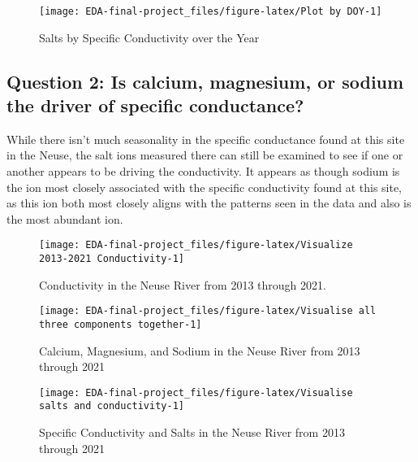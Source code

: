 \documentclass[
  12pt,
]{article}
\begin{document}
\begin{figure}

\texttt{[image: EDA-final-project\_files/figure-latex/Plot by DOY-1]} \hfill{}

\caption{Salts by Specific Conductivity over the Year}\label{fig:Plot by DOY}
\end{figure}

\hypertarget{question-2-is-calcium-magnesium-or-sodium-the-driver-of-specific-conductance}{%
\subsection{Question 2: Is calcium, magnesium, or sodium the driver of
specific
conductance?}\label{question-2-is-calcium-magnesium-or-sodium-the-driver-of-specific-conductance}}

While there isn't much seasonality in the specific conductance found at
this site in the Neuse, the salt ions measured there can still be
examined to see if one or another appears to be driving the
conductivity. It appears as though sodium is the ion most closely
associated with the specific conductivity found at this site, as this
ion both most closely aligns with the patterns seen in the data and also
is the most abundant ion.

\begin{figure}

\texttt{[image: EDA-final-project\_files/figure-latex/Visualize 2013-2021 Conductivity-1]} \hfill{}

\caption{Conductivity in the Neuse River from 2013 through 2021.}\label{fig:Visualize 2013-2021 Conductivity}
\end{figure}

\begin{figure}

\texttt{[image: EDA-final-project\_files/figure-latex/Visualise all three components together-1]} \hfill{}

\caption{Calcium, Magnesium, and Sodium in the Neuse River from 2013 through 2021}\label{fig:Visualise all three components together}
\end{figure}

\begin{figure}

\texttt{[image: EDA-final-project\_files/figure-latex/Visualise salts and conductivity-1]} \hfill{}

\caption{Specific Conductivity and Salts in the Neuse River from 2013 through 2021}\label{fig:Visualise salts and conductivity}
\end{figure}
\end{document}
